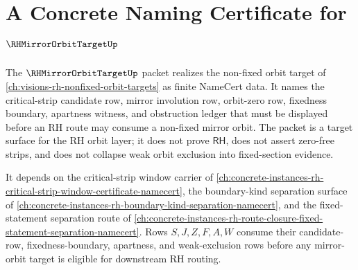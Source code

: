 \chapter{A Concrete Naming Certificate for $\RHMirrorOrbitTargetUp$}
\label{ch:concrete-instances-rh-mirror-orbit-target-namecert}

The $\RHMirrorOrbitTargetUp$ packet realizes the non-fixed orbit target of \autoref{ch:visions-rh-nonfixed-orbit-targets} as finite NameCert data. It names the critical-strip candidate row, mirror involution row, orbit-zero row, fixedness boundary, apartness witness, and obstruction ledger that must be displayed before an RH route may consume a non-fixed mirror orbit. The packet is a target surface for the RH orbit layer; it does not prove $\mathsf{RH}$, does not assert zero-free strips, and does not collapse weak orbit exclusion into fixed-section evidence.

It depends on the critical-strip window carrier of \autoref{ch:concrete-instances-rh-critical-strip-window-certificate-namecert}, the boundary-kind separation surface of \autoref{ch:concrete-instances-rh-boundary-kind-separation-namecert}, and the fixed-statement separation route of \autoref{ch:concrete-instances-rh-route-closure-fixed-statement-separation-namecert}. Rows $S,J,Z,F,A,W$ consume their candidate-row, fixedness-boundary, apartness, and weak-exclusion rows before any mirror-orbit target is eligible for downstream RH routing.

